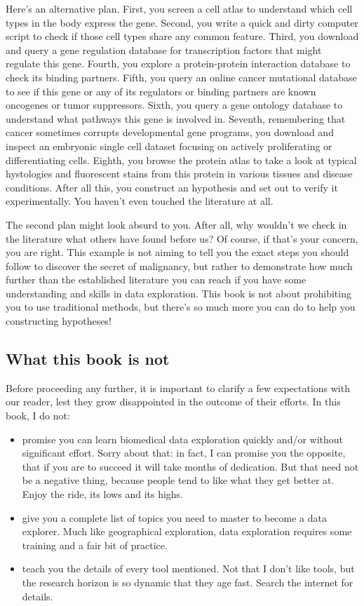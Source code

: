 \documentclass[12pt,a4paper,notitlepage,onecolumn]{article}
\begin{document}
Here's an alternative plan. First, you screen a cell atlas to understand which cell types in the body express the gene. Second, you write a quick and dirty computer script to check if those cell types share any common feature. Third, you download and query a gene regulation database for transcription factors that might regulate this gene. Fourth, you explore a protein-protein interaction database to check its binding partners. Fifth, you query an online cancer mutational database to see if this gene or any of its regulators or binding partners are known oncogenes or tumor suppressors. Sixth, you query a gene ontology database to understand what pathways this gene is involved in. Seventh, remembering that cancer sometimes corrupts developmental gene programs, you download and inspect an embryonic single cell dataset focusing on actively proliferating or differentiating cells. Eighth, you browse the protein atlas to take a look at typical hystologies and fluorescent stains from this protein in various tissues and disease conditions. After all this, you construct an hypothesis and set out to verify it experimentally. You haven't even touched the literature at all.

The second plan might look absurd to you. After all, why wouldn't we check in the literature what others have found before us? Of course, if that's your concern, you are right. This example is not aiming to tell you the exact steps you should follow to discover the secret of malignancy, but rather to demonstrate how much further than the established literature you can reach if you have some understanding and skills in data exploration. This book is not about prohibiting you to use traditional methods, but there's so much more you can do to help you constructing hypotheses!

\subsection*{What this book is not}
Before proceeding any further, it is important to clarify a few expectations with our reader, lest they grow disappointed in the outcome of their efforts. In this book, I do not:

\begin{itemize}
\item promise you can learn biomedical data exploration quickly and/or without significant effort. Sorry about that: in fact, I can promise you the opposite, that if you are to succeed it will take months of dedication. But that need not be a negative thing, because people tend to like what they get better at. Enjoy the ride, its lows and its highs.
\item give you a complete list of topics you need to master to become a data explorer. Much like geographical exploration, data exploration requires some training and a fair bit of practice.
\item teach you the details of every tool mentioned. Not that I don't like tools, but the research horizon is so dynamic that they age fast. Search the internet for details.
\end{itemize}
\end{document}
